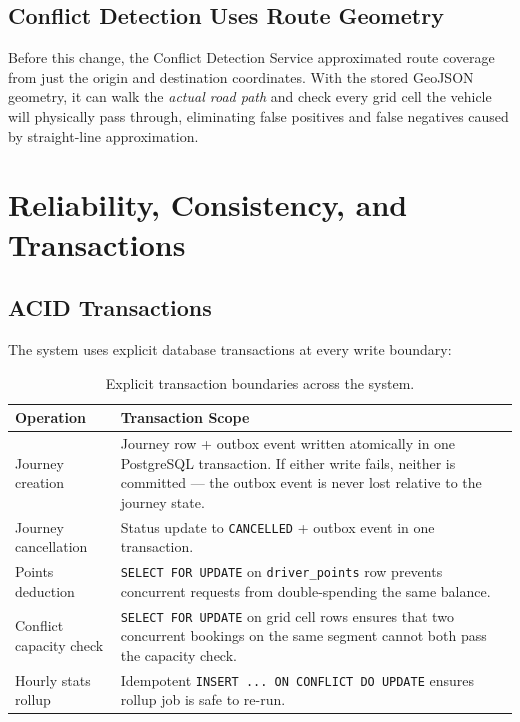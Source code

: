\documentclass[12pt,a4paper]{article}
\begin{document}
\subsection{Conflict Detection Uses Route Geometry}

Before this change, the Conflict Detection Service approximated route coverage from just the origin and destination coordinates. With the stored GeoJSON geometry, it can walk the \emph{actual road path} and check every grid cell the vehicle will physically pass through, eliminating false positives and false negatives caused by straight-line approximation.

\section{Reliability, Consistency, and Transactions}

\subsection{ACID Transactions}

The system uses explicit database transactions at every write boundary:

\begin{table}[H]
\centering
\small
\begin{tabularx}{\textwidth}{L{3.5cm} X}
  \toprule
  \textbf{Operation} & \textbf{Transaction Scope} \\
  \midrule
  Journey creation    & Journey row + outbox event written atomically in one PostgreSQL transaction. If either write fails, neither is committed --- the outbox event is never lost relative to the journey state. \\
  \addlinespace[0.15cm]
  Journey cancellation& Status update to \texttt{CANCELLED} + outbox event in one transaction. \\
  \addlinespace[0.15cm]
  Points deduction    & \texttt{SELECT FOR UPDATE} on \texttt{driver\_points} row prevents concurrent requests from double-spending the same balance. \\
  \addlinespace[0.15cm]
  Conflict capacity check & \texttt{SELECT FOR UPDATE} on grid cell rows ensures that two concurrent bookings on the same segment cannot both pass the capacity check. \\
  \addlinespace[0.15cm]
  Hourly stats rollup & Idempotent \texttt{INSERT ... ON CONFLICT DO UPDATE} ensures rollup job is safe to re-run. \\
  \bottomrule
\end{tabularx}
\caption{Explicit transaction boundaries across the system.}
\end{table}
\end{document}
